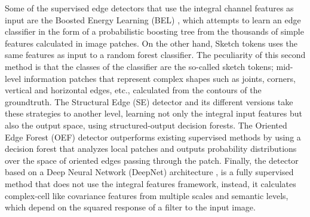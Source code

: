 Some of the supervised edge detectors that use the integral channel features as input are the Boosted Energy Learning (BEL) \citep{Dollar.ZhuowenTu.ea:CVPR:2006}, which attempts to learn an edge classifier in the form of a probabilistic boosting tree from the thousands of simple features calculated in image patches. On the other hand, Sketch tokens \citep{Lim.Zitnick.ea:CVPR:2013} uses the same features as input to a random forest classifier. The peculiarity of this second method is that the classes of the classifier are the so-called sketch tokens; mid-level information patches that represent complex shapes such as joints, corners, vertical and horizontal edges, etc., calculated from the contours of the groundtruth. The Structural Edge (SE) detector \citep{Dollar.Zitnick:ICCV:2013} and its different versions \citep{Dollar.Zitnick:PAMI:2015} take these strategies to another level, learning not only the integral input features but also the output space, using structured-output decision forests. The Oriented Edge Forest (OEF) detector \citep{Hallman.Fowlkes:CVPR:2015} outperforms existing supervised methods by using a decision forest that analyzes local patches and outputs probability distributions over the space of oriented edges passing through the patch. Finally, the detector based on a Deep Neural Network (DeepNet) architecture \citep{Kivinen.Williams.ea:PMLR:2014}, is a fully supervised method that does not use the integral features framework, instead, it calculates complex-cell like covariance features from multiple scales and semantic levels, which depend on the squared response of a filter to the input image.

